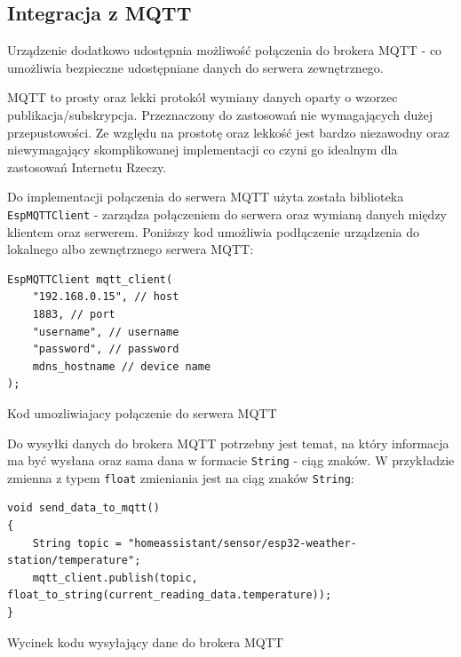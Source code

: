 \documentclass[12pt,a4paper]{article}
\begin{document}
\subsection{Integracja z MQTT}

Urządzenie dodatkowo udostępnia możliwość połączenia do brokera MQTT - co umożliwia bezpieczne udostępniane danych do serwera zewnętrznego.

MQTT to prosty oraz lekki protokół wymiany danych oparty o wzorzec publikacja/subskrypcja. Przeznaczony do zastosowań nie wymagających dużej przepustowości. Ze względu na prostotę oraz lekkość jest bardzo niezawodny oraz niewymagający skomplikowanej implementacji co czyni go idealnym dla zastosowań Internetu Rzeczy.

Do implementacji połączenia do serwera MQTT użyta została biblioteka \texttt{EspMQTTClient}\cite{esp32-mqtt-server-library} - 
zarządza połączeniem do serwera oraz wymianą danych między klientem oraz serwerem. Poniższy kod umożliwia podłączenie urządzenia do lokalnego albo zewnętrznego serwera MQTT: 
\begin{code}[H]
\begin{verbatim}
EspMQTTClient mqtt_client(
    "192.168.0.15", // host
    1883, // port
    "username", // username
    "password", // password
    mdns_hostname // device name
);
\end{verbatim}
\caption{Kod umozliwiajacy połączenie do serwera MQTT}
\label{diagnostic-data-code}
\end{code}

Do wysyłki danych do brokera MQTT potrzebny jest temat, na który informacja ma być wysłana oraz
sama dana w formacie \texttt{String} - ciąg znaków. W przykładzie zmienna z typem \texttt{float} zmieniania jest na ciąg znaków \texttt{String}:
\begin{code}[H]
\begin{verbatim}
void send_data_to_mqtt()
{
    String topic = "homeassistant/sensor/esp32-weather-station/temperature";
    mqtt_client.publish(topic, float_to_string(current_reading_data.temperature));
}
\end{verbatim}
\caption{Wycinek kodu wysyłający dane do brokera MQTT}
\label{mqtt-data-send}
\end{code}
\end{document}
